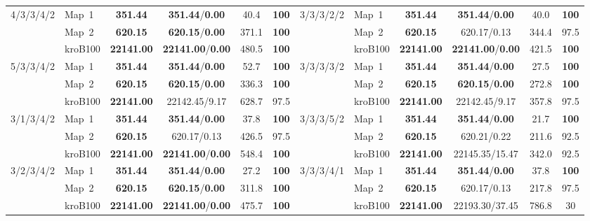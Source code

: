 \documentclass[lettersize,journal]{IEEEtran}
\begin{document}
\begin{table}[!t]
{\begin{tabular}{llcccc|llcccc}
\multirow{3}{*}{4/3/3/4/2} & Map~1 & \textbf{351.44} & \textbf{351.44}/\textbf{0.00} & 40.4 & \textbf{100} & \multirow{3}{*}{3/3/3/2/2} & Map~1 & \textbf{351.44} & \textbf{351.44}/\textbf{0.00} & 40.0 & \textbf{100} \\
& Map~2 & \textbf{620.15} & \textbf{620.15}/\textbf{0.00} & 371.1 & \textbf{100} & & Map~2 & \textbf{620.15} & 620.17/0.13 & 344.4 & 97.5 \\
& kroB100 & \textbf{22141.00} & \textbf{22141.00}/\textbf{0.00} & 480.5 & \textbf{100} & & kroB100 & \textbf{22141.00} & \textbf{22141.00}/\textbf{0.00} & 421.5 & \textbf{100} \\ \cline{2-6}\cline{8-12}
\multirow{3}{*}{5/3/3/4/2} & Map~1 & \textbf{351.44} & \textbf{351.44}/\textbf{0.00} & 52.7 & \textbf{100} & \multirow{3}{*}{3/3/3/3/2} & Map~1 & \textbf{351.44} & \textbf{351.44}/\textbf{0.00} & 27.5 & \textbf{100} \\
& Map~2 & \textbf{620.15} & \textbf{620.15}/\textbf{0.00} & 336.3 & \textbf{100} & & Map~2 & \textbf{620.15} & \textbf{620.15}/\textbf{0.00} & 272.8 & \textbf{100} \\
& kroB100 & \textbf{22141.00} & 22142.45/9.17 & 628.7 & 97.5 & & kroB100 & \textbf{22141.00} & 22142.45/9.17 & 357.8 & 97.5 \\ \cline{2-6}\cline{8-12}
\multirow{3}{*}{3/1/3/4/2} & Map~1 & \textbf{351.44} & \textbf{351.44}/\textbf{0.00} & 37.8 & \textbf{100} & \multirow{3}{*}{3/3/3/5/2} & Map~1 & \textbf{351.44} & \textbf{351.44}/\textbf{0.00} & 21.7 & \textbf{100} \\
& Map~2 & \textbf{620.15} & 620.17/0.13 & 426.5 & 97.5 & & Map~2 & \textbf{620.15} & 620.21/0.22 & 211.6 & 92.5 \\
& kroB100 & \textbf{22141.00} & \textbf{22141.00}/\textbf{0.00} & 548.4 & \textbf{100} & & kroB100 & \textbf{22141.00} & 22145.35/15.47 & 342.0 & 92.5 \\ \cline{2-6}\cline{8-12}
\multirow{3}{*}{3/2/3/4/2} & Map~1 & \textbf{351.44} & \textbf{351.44}/\textbf{0.00} & 27.2 & \textbf{100} & \multirow{3}{*}{3/3/3/4/1} & Map~1 & \textbf{351.44} & \textbf{351.44}/\textbf{0.00} & 37.8 & \textbf{100} \\
& Map~2 & \textbf{620.15} & \textbf{620.15}/\textbf{0.00} & 311.8 & \textbf{100} & & Map~2 & \textbf{620.15} & 620.17/0.13 & 217.8 & 97.5 \\
& kroB100 & \textbf{22141.00} & \textbf{22141.00}/\textbf{0.00} & 475.7 & \textbf{100} & & kroB100 & \textbf{22141.00} & 22193.30/37.45 & 786.8 & 30 \\ \cline{2-6}\cline{8-12}

\end{tabular}}
\end{table}
\end{document}
